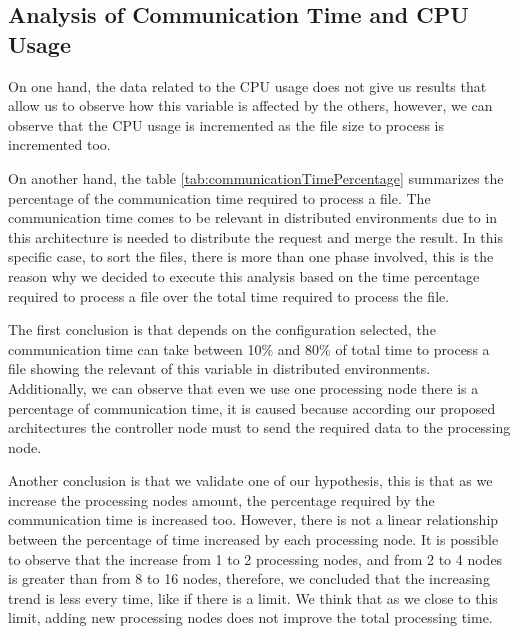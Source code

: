 \subsection{Analysis of Communication Time and CPU Usage }

On one hand, the data related to the CPU usage does not give us results that allow us to observe how this variable is affected by the others, however, we can observe that the CPU usage is incremented as the file size to process is incremented too.

On another hand, the table \ref{tab:communicationTimePercentage} summarizes the percentage of the communication time required to process a file. The communication time comes to be relevant in distributed environments due to in this architecture is needed to distribute the request and merge the result. In this specific case, to sort the files, there is more than one phase involved, this is the reason why we decided to execute this analysis based on the time percentage required to process a file over the total time required to process the file.

The first conclusion is that depends on the configuration selected, the communication time can take between 10\% and 80\% of total time to process a file showing the relevant of this variable in distributed environments. Additionally, we can observe that even we use one processing node there is a percentage of communication time, it is caused because according our proposed architectures the controller node must to send the required data to the processing node. 

Another conclusion is that we validate one of our hypothesis, this is that as we increase the processing nodes amount, the percentage required by the communication time is increased too. However, there is not a linear relationship between the percentage of time increased by each processing node. It is possible to observe that the increase from 1 to 2 processing nodes, and from 2 to 4 nodes is greater than from 8 to 16 nodes, therefore, we concluded that the increasing trend is less every time, like if there is a limit. We think that as we close to this limit, adding new processing nodes does not improve the total processing time.

